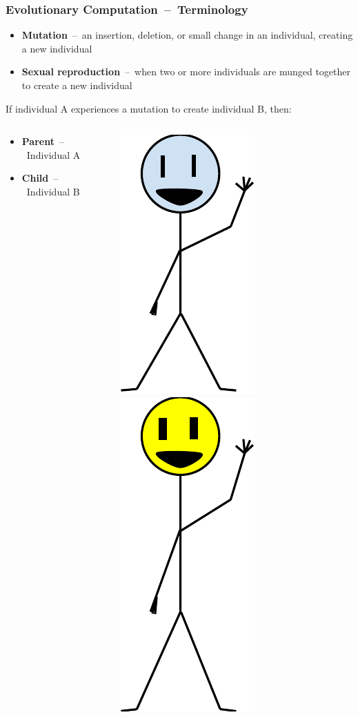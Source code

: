 \documentclass{beamer}
\newcommand{\linespace}{\vskip 0.25cm}
\begin{document}
\begin{frame}
	\frametitle{Evolutionary Computation~--~Terminology}
	\begin{itemize}
		\item \textbf{Mutation}~--~an insertion, deletion, or small change in an individual, creating a new individual
		\linespace
		\item \textbf{Sexual reproduction}~--~when two or more individuals are munged together to create a new individual
		\linespace
		\pause
	\end{itemize}
		If individual A experiences a mutation to create individual B, then:
	\begin{columns}
		\begin{column}{.6\textwidth}
			\begin{itemize}
				\item \textbf{Parent}~--~Individual A
				\linespace
				\linespace
				\linespace
				\linespace
				\item \textbf{Child}~--~Individual B
			\end{itemize}
		\end{column}
		\begin{column}{.4\textwidth}
			\pause[2]
			\includegraphics[height=.4\textwidth]{Illustrations/individual.PDF}
			\linespace
			\pause[2]
			\includegraphics[height=.5\textwidth]{Illustrations/child.PDF}
		\end{column}
	\end{columns}
\end{frame}
\end{document}

